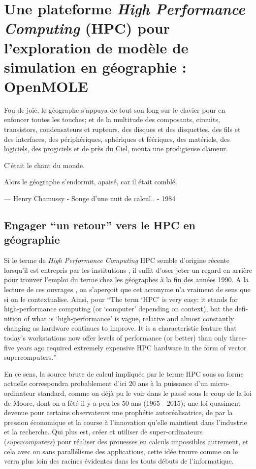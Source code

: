 
\newcommand\litem[1]{\item{\bfseries #1,\enspace}}

\section{Une plateforme \textit{High Performance Computing} (HPC) pour l'exploration de modèle de simulation en géographie : OpenMOLE}
\label{sec:retourgeoHPCopenmole}

\epigraph {Fou de joie, le géographe s'appuya de tout son long sur le clavier pour en enfoncer toutes les touches; et de la multitude des composants, circuits, transistors, condensateurs et rupteurs, des disques et des disquettes, des fils et des interfaces, des périphériques, sphériques et féériques, des matériels, des logiciels, des progiciels et de près du Ciel, monta une prodigieuse clameur.

C'était le chant du monde.

Alors le géographe s'endormit, apaisé, car il était comblé.}{ --- \textup{Henry Chamussy - Songe d'une nuit de calcul.. - 1984}}

\subsection{Engager \enquote{un retour} vers le HPC en géographie}
\label{ssec:retourHPC}

Si le terme de \textit{High Performance Computing} HPC semble d'origine récente lorsqu'il est entrepris par les institutions \autocite{HPCHorizon2020}, il suffit d'oser jeter un regard en arrière pour trouver l'emploi du terme chez les géographes à la fin des années 1990. A la lecture de ces ouvrages \autocites{Turton1998, Openshaw2000, Openshaw2000b}, on s'aperçoit que cet acronyme n'a vraiment de sens que si on le contextualise. Ainsi, pour \textcite{Openshaw2000} \foreignquote{english}{The term \enquote{HPC} is very easy: it stands for high-performance computing (or \enquote{computer} depending on context), but the definition of what is \enquote{high-performance} is vague, relative and almost constantly changing as hardware continues to improve. It is a characteristic feature that today's workstations now offer levels of performance (or better) than only three-five years ago required extremely expensive HPC hardware in the form of vector supercomputers.}

En ce sens, la source brute de calcul impliquée par le terme HPC sous sa forme actuelle correspondra probablement d'ici 20 ans à la puissance d'un micro-ordinateur standard, comme on déjà pu le voir dans le passé sous le coup de la loi de Moore, dont on a fêté il y a peu les 50 ans (1965 - 2015); une loi quasiment devenue pour certains observateurs une prophétie autoréalisatrice, de par la pression économique et la course à l'innovation qu'elle maintient dans l'industrie et la recherche. Qui plus est, créer et utiliser de super-ordinateurs (\textit{supercomputers}) pour réaliser des prouesses en calculs impossibles autrement, et cela avec ou sans parallélisme des applications, cette idée trouve comme on le verra plus loin des racines évidentes dans les touts débuts de l'informatique.

